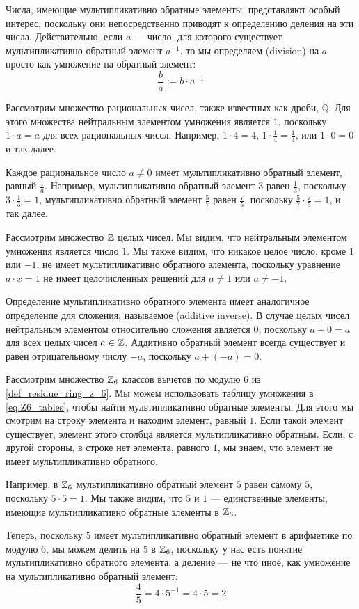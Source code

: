 Числа, имеющие мультипликативно обратные элементы, представляют особый интерес, поскольку они непосредственно приводят к определению деления на эти числа. Действительно, если $a$ — число, для которого существует мультипликативно обратный элемент $a^{-1}$, то мы определяем  (division) на $a$ просто как умножение на обратный элемент:
\begin{equation}
\frac{b}{a}:= b\cdot a^{-1}
\end{equation}
\begin{example} Рассмотрим множество рациональных чисел, также известных как дроби, $\mathbb{Q}$. Для этого множества нейтральным элементом умножения является $1$, поскольку $1\cdot a = a$ для всех рациональных чисел. Например, $1\cdot 4=4$, $1\cdot \frac{1}{4}=\frac{1}{4}$, или $1\cdot 0 =0$ и так далее.

Каждое рациональное число $a\neq 0$ имеет мультипликативно обратный элемент, равный $\frac{1}{a}$.
Например, мультипликативно обратный элемент $3$ равен $\frac{1}{3}$, поскольку $3\cdot \frac{1}{3}=1$, мультипликативно обратный элемент $\frac{5}{7}$ равен $\frac{7}{5}$, поскольку $\frac{5}{7}\cdot \frac{7}{5}=1$, и так далее.
\end{example}
\begin{example} Рассмотрим множество $\mathbb{Z}$ целых чисел. Мы видим, что нейтральным элементом умножения является число $1$. Мы также видим, что никакое целое число, кроме $1$ или $-1$, не имеет мультипликативно обратного элемента, поскольку уравнение $a\cdot x =1$ не имеет целочисленных решений для $a\neq 1$ или $a\neq -1$.

Определение мультипликативно обратного элемента имеет аналогичное определение для сложения, называемое  (additive inverse). В случае целых чисел нейтральным элементом относительно сложения является $0$, поскольку $a+0=a$ для всех целых чисел $a\in\mathbb{Z}$. Аддитивно обратный элемент всегда существует и равен отрицательному числу $-a$, поскольку $a+(-a)=0$.
\end{example}
\begin{example} Рассмотрим множество $\mathbb{Z}_6$ классов вычетов по модулю $6$ из \examplename{} \ref{def_residue_ring_z_6}. Мы можем использовать таблицу умножения в \eqref{eq:Z6_tables}, чтобы найти мультипликативно обратные элементы. Для этого мы смотрим на строку элемента и находим элемент, равный $1$. Если такой элемент существует, элемент этого столбца является мультипликативно обратным. Если, с другой стороны, в строке нет элемента, равного $1$, мы знаем, что элемент не имеет мультипликативно обратного.

Например, в $\mathbb{Z}_6$ мультипликативно обратный элемент $5$ равен самому $5$, поскольку $5\cdot 5=1$. Мы также видим, что $5$ и $1$ — единственные элементы, имеющие мультипликативно обратные элементы в $\mathbb{Z}_6$.

Теперь, поскольку $5$ имеет мультипликативно обратный элемент в арифметике по модулю $6$, мы можем делить на $5$ в $\mathbb{Z}_6$, поскольку у нас есть понятие мультипликативно обратного элемента, а деление — не что иное, как умножение на мультипликативно обратный элемент:
$$
\frac{4}{5}= 4\cdot 5^{-1} = 4\cdot 5 = 2
$$
\end{example}
